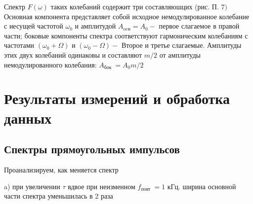 \documentclass[a4paper,12pt]{article} %
\begin{document}
Спектр $F(\omega)$ таких колебаний содержит три составляюшцих (рис. П. 7$)$ Основная компонента представляет собой исходное немодулированное колебание с иесущей частотой $\omega_{0}$ и амплитудой $A_{\mathrm{ocн}}=A_{0}-$ первое слагаемое в правой части; боковые компоненты спектра соответствуют гармоническим колебаниям с частотами $\left(\omega_{0}+\Omega\right)$ и $\left(\omega_{0}-\Omega\right)-$ Второе и третье слагаемые. Амплитуды этих двух колебаний одинаковы и составляют $m / 2$ от амплитуды немодулированного колебания: $A_{\text {бок }}=A_{0} m / 2$
\newpage

\section{Результаты измерений и обработка данных}
\subsection{Спектры прямоугольных импульсов}
Проанализируем, как меняется спектр 

a) при увеличении $\tau$ вдвое при неизменном $f_{\text {повт }}=1$ кГц. ширина основной части спектра уменьшилась в 2 раза\\
\end{document}
